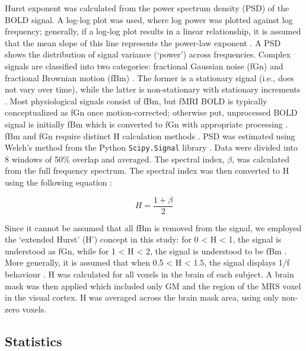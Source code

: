 \documentclass[
true
]{sn-jnl}
\begin{document}
Hurst exponent was calculated from the power spectrum density (PSD) of
the BOLD signal. A log-log plot was used, where log power was plotted
against log frequency; generally, if a log-log plot results in a linear
relationship, it is assumed that the mean slope of this line represents
the power-law exponent \citep{zimmernWhyBrainCriticality2020}. A PSD
shows the distribution of signal variance (`power') across frequencies.
Complex signals are classified into two categories: fractional Gaussian
noise (fGn) and fractional Brownian motion (fBm)
\citep{duffPowerSpectralDensity2008, ekeFractalCharacterizationComplexity2002}.
The former is a stationary signal (i.e., does not vary over time), while
the latter is non-stationary with stationary increments
\citep{ekeFractalCharacterizationComplexity2002}. Most physiological
signals consist of fBm, but fMRI BOLD is typically conceptualized as fGn
once motion-corrected; otherwise put, unprocessed BOLD signal is
initially fBm which is converted to fGn with appropriate processing
\citep{bullmoreWaveletsFunctionalMagnetic2004}. fBm and fGn require
distinct H calculation methods
\citep{ekeFractalCharacterizationComplexity2002}. PSD was estimated
using Welch's method \citep{welchUseFastFourier1967} from the Python
\texttt{Scipy.Signal} library \citep{virtanenSciPy10Fundamental2020}.
Data were divided into 8 windows of 50\% overlap and averaged. The
spectral index, \(\beta\), was calculated from the full frequency
spectrum. The spectral index was then converted to H using the following
equation
\citep{ekeFractalCharacterizationComplexity2002, schaeferComparativeAnalysisSpectral2014}:

\[
H = \frac{1 + \beta}{2}
\]

Since it cannot be assumed that all fBm is removed from the signal, we
employed the `extended Hurst' (H') concept in this study: for 0
\textless{} H \textless{} 1, the signal is understood as fGn, while for
1 \textless{} H \textless{} 2, the signal is understood to be fBm
\citep{campbellFractalBasedAnalysisFMRI2022, hartmannRealtimeFractalSignal2013, ekePhysiologicalTimeSeries2000}.
More generally, it is assumed that when 0.5 \textless{} H \textless{}
1.5, the signal displays 1/f behaviour
\citep{zimmernWhyBrainCriticality2020}. H was calculated for all voxels
in the brain of each subject. A brain mask was then applied which
included only GM and the region of the MRS voxel in the visual cortex. H
was averaged across the brain mask area, using only non-zero voxels.

\subsection{Statistics}\label{statistics}
\end{document}
